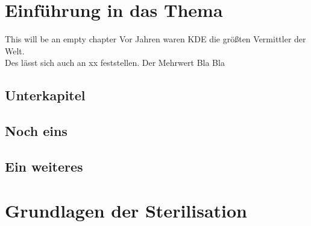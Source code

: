 \documentclass[
    12pt, %
    ngerman, %
    a4paper, %
    oneside, %
    headings=big, %
    listof=totoc, %
    bibliography=totoc, %
    index=totoc, %
    captions=tableheading, %
    final %
    sectionentrydots=true,
    toc = bibliography,
]{scrreprt}
\begin{document}
\opensymdef{}


\closesymdef{}
\renewcommand{\symheadingname}{Symbolverzeichnis}
\listofsymbols{}


\vspace{2cm}




\cleardoublepage{}



\newpage
{}
\ofoot{\thepage}
\ihead{}
\chead{}
\ohead{}


\chapter{Einführung in das Thema}

This will be an empty chapter
Vor Jahren waren \ac{KDE} die größten Vermittler der Welt. \\
Des lässt sich auch an xx feststellen. Der Mehrwert Bla Bla \blindtext\par


\blindtext{}

\section{Unterkapitel}
\blindtext{}
\section{Noch eins}
\section{Ein weiteres}

\newpage

\chapter{Grundlagen der Sterilisation}
\blindtext[1]
\end{document}
